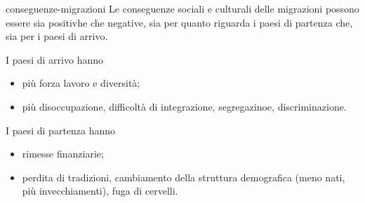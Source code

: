 \documentclass[preview]{standalone}
\begin{document}
\begin{snippet}{conseguenze-migrazioni}
    Le conseguenze sociali e culturali delle migrazioni
    possono essere sia positivhe che negative, sia per quanto
    riguarda i paesi di partenza che, sia per i paesi di arrivo.
    
    I paesi di arrivo hanno
    \begin{itemize}
        \item \greenbox più forza lavoro e diversità;
        \item \redbox più disoccupazione, difficoltà di integrazione,
        segregazinoe, discriminazione.
    \end{itemize}
    
    I paesi di partenza hanno
    \begin{itemize}
        \item \greenbox rimesse finanziarie;
        \item \redbox perdita di tradizioni,
        cambiamento della struttura demografica (meno nati, più invecchiamenti),
        fuga di cervelli.
    \end{itemize}
\end{snippet}
\end{document}
